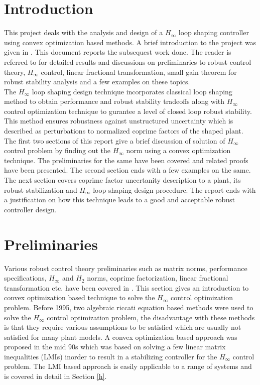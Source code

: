 \documentclass[a4paper,12pt]{article}
\begin{document}
\section{Introduction}
This project deals with the analysis and design of a $H_{\infty}$ loop shaping controller using convex optimization based methods.
A brief introduction to the project was given in \cite{prev}. This document reports the subsequest work done. The reader is referred to \cite{prev} for detailed results and discussions on preliminaries to robust control theory, $H_{\infty}$ control, linear fractional transformation, small gain theorem for robust stability analysis and a few examples on these topics. \\
The $H_{\infty}$ loop shaping design technique incorporates classical loop shaping method to obtain performance and robust stability tradeoffs along with $H_{\infty}$ control optimization technique to gurantee a level of closed loop robust stability. This method ensures robustness against unstructured uncertainty which is described as perturbations to normalized coprime factors of the shaped plant. \\
The first two sections of this report give a brief discussion of solution of $H_{\infty}$ control problem by finding out the $H_{\infty}$ norm using a convex optimization technique. The preliminaries for the same have been covered and related proofs have been presented. The second section ends with a few examples on the same. The next section covers coprime factor uncertanity description to a plant, its robust stabilization and $H_{\infty}$ loop shaping design procedure. The report ends with a justification on how this technique leads to a good and acceptable robust controller design.
\section{Preliminaries}
Various robust control theory preliminaries such as matrix norms, performance specifications, $H_{\infty}$ and $H_{2}$ norms, coprime factorization, linear fractional transformation etc. have been covered in \cite{prev}. This section gives an introduction to  convex optimization based technique to solve the $H_{\infty}$ control optimization problem. Before 1995, two algebraic riccati equation based methods were used to solve the $H_{\infty}$ control optimization problem, the disadvantage with these methods is that they require various assumptions to be satisfied which are usually not satisfied for many plant models. A convex optimization based approach was proposed in the mid 90s which was based on solving a few linear matrix inequalities (LMIs) inorder to result in a stabilizing controller for the $H_{\infty}$ control problem. The LMI based approach is easily applicable to a range of systems and is covered in detail in Section \ref{h}.
\end{document}
